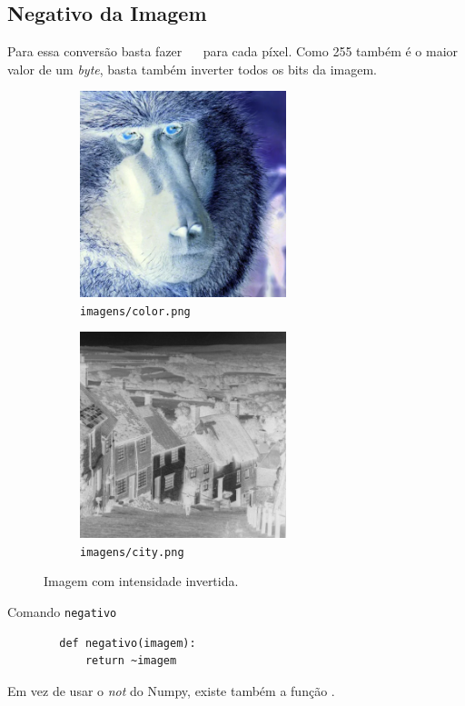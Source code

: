 \subsection{Negativo da Imagem}

Para essa conversão basta fazer ~~ para cada píxel. Como 255 também é o maior valor de um \textit{byte}, basta também inverter todos os bits da imagem.

\begin{figure}[H]
    \centering
    \begin{subfigure}{0.45\textwidth}
        \centering
        \includegraphics[width=6cm]{resultados/colorneg.png}
        \caption{\texttt{imagens/color.png}}
    \end{subfigure}%
    \begin{subfigure}{0.45\textwidth}
        \centering
        \includegraphics[width=6cm]{resultados/cityneg.png}
        \caption{\texttt{imagens/city.png}}
    \end{subfigure}

    \caption{Imagem com intensidade invertida.}
\end{figure}

\begin{listing}[H]
    \caption{Comando \texttt{negativo}}

    \begin{verbatim}
        def negativo(imagem):
            return ~imagem
    \end{verbatim}
\end{listing}

Em vez de usar o \textit{not} do Numpy, existe também a função  \autocite{ref:bitwise_not}.
